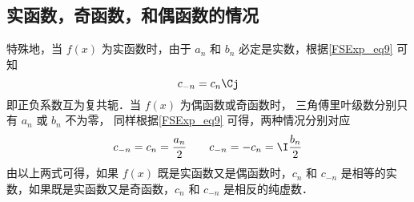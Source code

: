 \subsection{实函数，奇函数，和偶函数的情况}
特殊地，当 $f(x)$ 为实函数时，由于 $a_n$ 和 $b_n$ 必定是实数，根据\autoref{FSExp_eq9} 可知
\begin{equation}
c_{-n} = c_{n}\Cj
\end{equation}
即正负系数互为复共轭．当 $f(x)$ 为偶函数或奇函数时， 三角傅里叶级数分别只有 $a_n$ 或 $b_n$ 不为零， 同样根据\autoref{FSExp_eq9} 可得，两种情况分别对应
\begin{equation}
c_{-n} = c_n =\frac{a_n}{2} \qquad
c_{-n} = -c_n = \I \frac{b_n}{2}
\end{equation}
由以上两式可得，如果 $f(x)$ 既是实函数又是偶函数时，$c_n$ 和 $c_{-n}$ 是相等的实数，如果既是实函数又是奇函数，$c_n$ 和 $c_{-n}$ 是相反的纯虚数．
